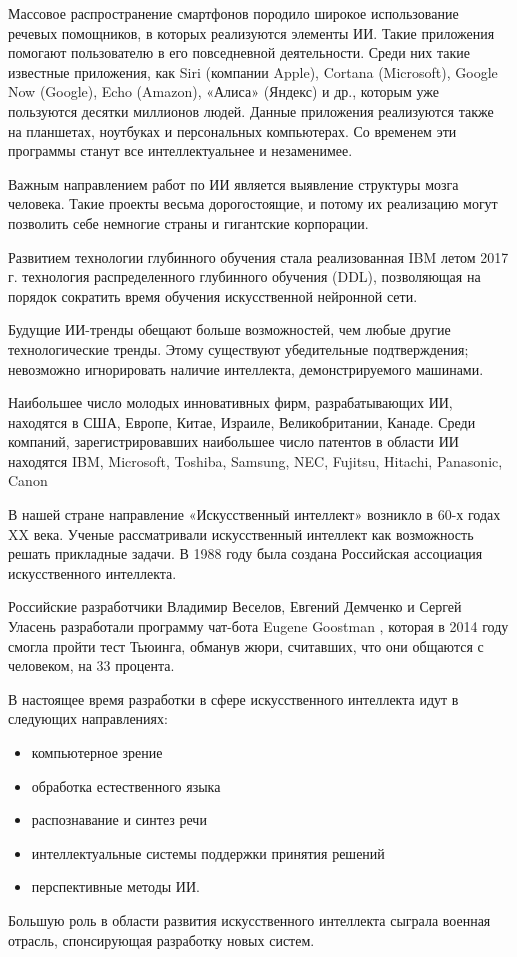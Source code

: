 \documentclass[bachelor,och,referat]{SCWorks_corrected}
\begin{document}
Массовое распространение смартфонов породило широкое использование речевых помощников, в которых реализуются элементы ИИ. Такие приложения помогают пользователю в его повседневной деятельности. Среди них такие известные приложения, как Siri (компании Apple), Cortana (Microsoft), Google Now (Google), Echo (Amazon), «Алиса» (Яндекс) и др., которым уже пользуются десятки миллионов людей. Данные приложения реализуются также на планшетах, ноутбуках и персональных компьютерах. Со временем эти программы станут все интеллектуальнее и незаменимее.

Важным направлением работ по ИИ является выявление структуры мозга человека. Такие проекты весьма дорогостоящие, и потому их реализацию могут позволить себе немногие страны и гигантские корпорации. 

Развитием технологии глубинного обучения стала реализованная IBM летом 2017 г. технология распределенного глубинного обучения (DDL), позволяющая на порядок сократить время обучения искусственной нейронной сети.

Будущие ИИ-тренды обещают больше возможностей, чем любые другие технологические тренды. Этому существуют убедительные подтверждения; невозможно игнорировать наличие интеллекта, демонстрируемого машинами.

Наибольшее число молодых инновативных фирм, разрабатывающих ИИ, находятся в США, Европе, Китае, Израиле, Великобритании, Канаде. Среди компаний, зарегистрировавших наибольшее число патентов в области ИИ находятся IBM, Microsoft, Toshiba, Samsung, NEC, Fujitsu, Hitachi, Panasonic, Canon

В нашей стране направление «Искусственный интеллект» возникло в 60-х годах XX века. Ученые рассматривали искусственный интеллект как возможность решать прикладные задачи. В 1988 году была создана Российская ассоциация искусственного интеллекта.\cite{N12}

Российские разработчики Владимир Веселов, Евгений Демченко и Сергей Уласень разработали программу чат-бота Eugene Goostman , которая в 2014 году смогла пройти тест Тьюинга, обманув жюри, считавших, что они общаются с человеком, на 33 процента.

В настоящее время разработки в сфере искусственного интеллекта идут в следующих направлениях:\cite{N2} 
\begin{itemize} 
    \item компьютерное зрение
    \item обработка естественного языка
    \item распознавание и синтез речи
    \item интеллектуальные системы поддержки принятия решений
    \item перспективные методы ИИ.
\end{itemize} 
Большую роль в области развития искусственного интеллекта сыграла военная отрасль, спонсирующая разработку новых систем.
\end{document}

